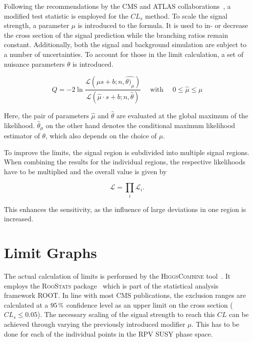 Following the recommendations by the CMS and ATLAS collaborations~\cite{clsmod}, a modified test statistic is employed for the $CL_s$ method. To scale the signal strength, a parameter $\mu$ is introduced to the formula. It is used to in- or decrease the cross section of the signal prediction while the branching ratios remain constant. Additionally, both the signal and background simulation are subject to a number of uncertainties. To account for those in the limit calculation, a set of nuisance parameters $\theta$ is introduced.

\begin{equation}
  \label{eq:q-mod}
  Q = - 2 \ln{ \frac{\mathcal{L} (\mu s + b; n, \hat{\theta)_\mu}) }{\mathcal{L} (\hat{\mu} \cdot s + b; n, \hat{\theta} )} } \quad \text{ with } \quad 0 \leq \hat{\mu} \leq \mu
\end{equation}

\noindent Here, the pair of parameters $\hat{\mu}$ and $\hat{\theta}$ are evaluated at the global maximum of the likelihood. $\hat{\theta}_\mu$ on the other hand denotes the conditional maximum likelihood estimator of $\theta$, which also depends on the choice of $\mu$.


To improve the limits, the signal region is subdivided into multiple signal regions. When combining the results for the individual regions, the respective likelihoods have to be multiplied and the overall value is given by

\begin{equation}
  \label{eq:likelihood-product}
  \mathcal{L} = \prod_i \mathcal{L}_i.
\end{equation}

\noindent This enhances the sensitivity, as the influence of large deviations in one region is increased.

\section{Limit Graphs}
\label{sec:limit-graphs}

The actual calculation of limits is performed by the \textsc{HiggsCombine} tool~\cite{clsmod,higgscombine}. It employs the \textsc{RooStats} package~\cite{roostats} which is part of the statistical analysis framework \textsc{ROOT}. In line with most CMS publications, the exclusion ranges are calculated at a $95\,\pct$ confidence level as an upper limit on the cross section ($CL_s \leq 0.05$). The necessary scaling of the signal strength to reach this $CL$ can be achieved through varying the previously introduced modifier $\mu$. This has to be done for each of the individual points in the RPV SUSY phase space.

